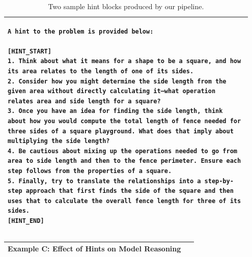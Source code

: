 \documentclass{article}
\begin{document}
{\begin{table}[H]
\begin{tabular}{|p{0.95\linewidth}|}
\begin{Verbatim}[fontsize=\scriptsize, breaklines=true]
A hint to the problem is provided below:

[HINT_START]
1. Think about what it means for a shape to be a square, and how its area relates to the length of one of its sides.
2. Consider how you might determine the side length from the given area without directly calculating it—what operation relates area and side length for a square?
3. Once you have an idea for finding the side length, think about how you would compute the total length of fence needed for three sides of a square playground. What does that imply about multiplying the side length?
4. Be cautious about mixing up the operations needed to go from area to side length and then to the fence perimeter. Ensure each step follows from the properties of a square.
5. Finally, try to translate the relationships into a step-by-step approach that first finds the side of the square and then uses that to calculate the overall fence length for three of its sides.
[HINT_END]
\end{Verbatim}
\\ \hline
\end{tabular}
\caption{Two sample hint blocks produced by our pipeline.}
\label{tab:hint_examples}
\end{table}

\begin{table}[H]
\centering
\renewcommand{\arraystretch}{1.1}
\begin{tabular}{|p{0.95\linewidth}|}
\hline
\textbf{Example C: Effect of Hints on Model Reasoning}\\
\hline


\end{tabular}
\end{table}}
\end{document}
